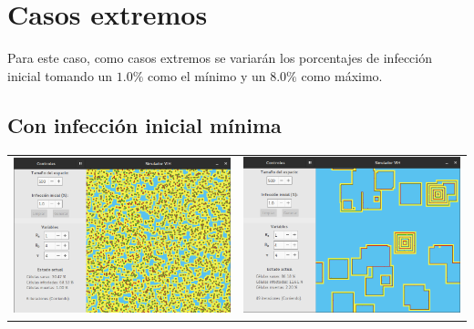 \documentclass[12pt,letterpaper,oneside]{report}
\begin{document}
	\section{Casos extremos} %
	Para este caso, como casos extremos se variarán los porcentajes de infección inicial tomando un $1.0\%$ como el mínimo y un $8.0\%$ como máximo.
	\label{sec:casos_extremos_1}
	\subsection{Con infección inicial mínima} %
	\label{sub:con_infecci_n_inicial_m_nima}
	\begin{center}
		\begin{tabular}{c c}
		\includegraphics[width=8cm]{img/original/min/1.png} & \includegraphics[width=8cm]{img/original/min/2.png} \\
		\end{tabular}
	\end{center}
\end{document}

